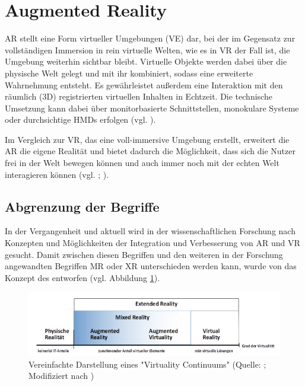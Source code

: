 \section{Augmented Reality}

\ac{AR} stellt eine Form virtueller Umgebungen (\ac{VE}) dar, bei der im Gegensatz zur vollständigen Immersion in rein virtuelle Welten, wie es in \ac{VR} der Fall ist, die Umgebung weiterhin sichtbar bleibt. Virtuelle Objekte werden dabei über die physische Welt gelegt und mit ihr kombiniert, sodass eine erweiterte Wahrnehmung entsteht. Es gewährleistet außerdem eine Interaktion mit den räumlich (\ac{3D}) registrierten virtuellen Inhalten in Echtzeit. Die technische Umsetzung kann dabei über monitorbasierte Schnittstellen, monokulare Systeme oder durchsichtige \ac{HMD}s erfolgen (vgl. \cite[S. 2f]{azuma_survey_1997}).

Im Vergleich zur \ac{VR}, das eine voll-immersive Umgebung erstellt, erweitert die \ac{AR} die eigene Realität und bietet dadurch die Möglichkeit, dass sich die Nutzer frei in der Welt bewegen können und auch immer noch mit der echten Welt interagieren können (vgl. \citealp[S. 79]{billinghurst_survey_2015}; \citealp[S. 1]{stefanidi_meaningful_2024}).

\subsection{Abgrenzung der Begriffe}
In der Vergangenheit und aktuell wird in der wissenschaftlichen Forschung nach Konzepten und Möglichkeiten der Integration und Verbesserung von \ac{AR} und \ac{VR} gesucht. Damit zwischen diesen Begriffen und den weiteren in der Forschung angewandten Begriffen \ac{MR} oder \ac{XR} unterschieden werden kann, wurde von  \cite{milgram_taxonomy_1994} das Konzept des  entworfen (vgl. Abbildung \ref{fig:virtuality-continuum}).

\begin{figure}[ht]
\centering
\includegraphics[width=1\linewidth]{content/pictures/virtuality-continuum_upscaled.PNG}
\caption{Vereinfachte Darstellung eines "Virtuality Continuums" (Quelle: \citealp[S. 9]{knoll_augmented_2022}; Modifiziert nach \citealp[S. 3]{milgram_taxonomy_1994})}
\label{fig:virtuality-continuum}
\end{figure}

